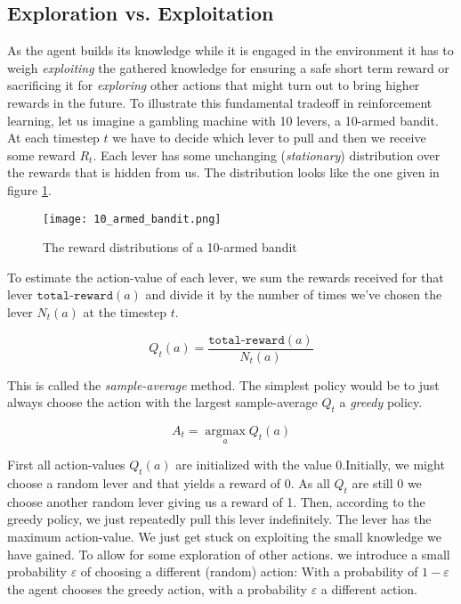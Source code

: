 \subsection{Exploration vs. Exploitation}
\label{exploration_vs_exploitation}
As the agent builds its knowledge while it is engaged in the environment it has to weigh \textit{exploiting} the gathered knowledge for ensuring a safe short term reward or sacrificing it for \textit{exploring} other actions that might turn out to bring higher rewards in the future. To illustrate this fundamental tradeoff in reinforcement learning, let us imagine a gambling machine with 10 levers, a 10-armed bandit. At each timestep $ t $ we have to decide which lever to pull and then we receive some reward $ R_t $. Each lever has some unchanging (\textit{stationary}) distribution over the rewards that is hidden from us. The distribution looks like the one given in figure \ref{10_armed_bandit}.

\begin{figure}
    \centering
    \texttt{[image: 10\_armed\_bandit.png]}
    \caption{The reward distributions of a 10-armed bandit \cite[p. 28]{sutton_reinforcement_2018}}
    \label{10_armed_bandit}
\end{figure}

To estimate the action-value of each lever, we sum the rewards received for that lever $ \texttt{total-reward}(a) $ and divide it by the number of times we've chosen the lever $ N_t(a) $ at the timestep $ t $.

$$
    Q_t(a) = \frac{\texttt{total-reward}(a)}{N_t(a)}
$$

This is called the \textit{sample-average} method. The simplest policy would be to just always choose the action with the largest sample-average $ Q_t $ a \textit{greedy} policy.

$$
    A_t = \operatorname*{argmax}_a Q_t(a)
$$

First all action-values $Q_t(a)$ are initialized with the value $0$.Initially, we might choose a random lever and that yields a reward of $0$. As all $ Q_t $ are still $0$ we choose another random lever giving us a reward of 1. Then, according to the greedy policy, we just repeatedly pull this lever indefinitely. The lever has the maximum action-value. We just get stuck on exploiting the small knowledge we have gained. To allow for some exploration of other actions. we introduce a small probability $\varepsilon $ of choosing a different (random) action: With a probability of $ 1- \varepsilon $ the agent chooses the greedy action, with a probability $ \varepsilon $ a different action.

